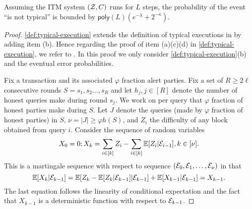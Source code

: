 \begin{theorem} \label{thm:typical-execution}
    Assuming the ITM system $(\mathcal{Z}, C)$ runs for $L$ steps, the probability of the event ``\E is not typical'' is bounded by $\mathsf{poly}(L)(e^{-\lambda} + 2^{-\kappa})$.
\end{theorem}

\begin{proof}
    \cref{def:typical-execution} extends the definition of typical executions in \cite{EPRINT:GarKiaLeo20} by adding item (b).
    Hence regarding the proof of item (a)(c)(d) in \cref{def:typical-execution}, we refer to \cite{EPRINT:GarKiaLeo20}.
    In this proof we only consider \cref{def:typical-execution}(b) and the eventual error probabilities.

    Fix a transaction \tx and its associated $\varphi$ fraction alert parties.
    Fix a set of $R \ge 2\ell$ consecutive rounds $S = s_1, s_2 \ldots, s_R$ and let $h_j, j \in [R]$ denote the number of honest queries make during round $s_j$.
    We work on per query that $\varphi$ fraction of honest parties make during $S$.
    Let $J$ denote the queries (made by $\varphi$ fraction of honest parties) in $S$, $\nu = |J| \ge \varphi h(S)$, and $Z_i$ the difficulty of any block obtained from query $i$. Consider the sequence of random variables
    \[ X_0 = 0; X_k = \sum_{i \in [k]} Z_i - \sum_{i \in [k]} \mathbb{E} [Z_i | \mathcal{E}_{i - 1}], k \in [\nu]. \]
    This is a martingale sequence with respect to sequence $(\mathcal{E}_0, \mathcal{E}_1, \ldots, \mathcal{E}_\nu)$ in that
    \begin{equation*} \label{eq:martingale-details}
        \mathbb{E} [X_k | \mathcal{E}_{k - 1}] = \mathbb{E} [Z_k - \mathbb{E} [Z_k | \mathcal{E}_{k - 1}] | \mathcal{E}_{k - 1}] + \mathbb{E} [X_{k - 1} | \mathcal{E}_{k - 1}] = X_{k - 1}.
    \end{equation*}
    The last equation follows the linearity of conditional expectation and the fact that $ X_{k - 1}$ is a deterministic function with respect to $\mathcal{E}_{k - 1}$.


\end{proof}
